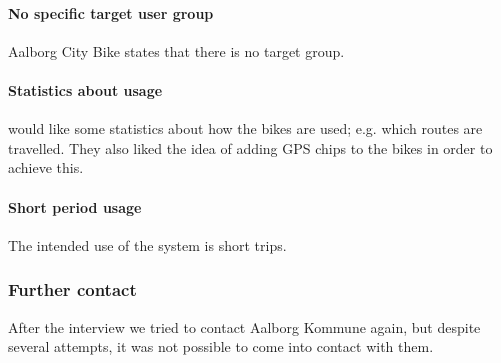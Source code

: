 \paragraph{No specific target user group}
Aalborg City Bike states that there is no target group.

\paragraph{Statistics about usage}
\citybike would like some statistics about how the bikes are used; e.g. which routes are travelled.
They also liked the idea of adding GPS chips to the bikes in order to achieve this.

\paragraph{Short period usage}
The intended use of the system is short trips.

\subsubsection{Further contact}
After the interview we tried to contact Aalborg Kommune again, but despite several attempts, it was not possible to come into contact with them.
